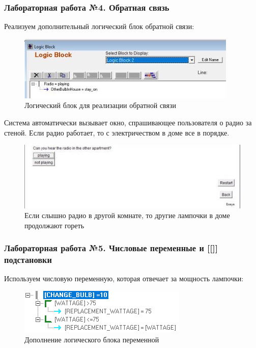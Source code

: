 \documentclass[14pt,a4paper,report]{report}
\begin{document}
\subsubsection{Лабораторная работа №4. Обратная связь}

Реализуем дополнительный логический блок обратной связи:

\begin{figure}[h!]
	\centering
	\includegraphics[scale = 1.2]{images/4_1.jpg}
	\caption{Логический блок для реализации обратной связи}
\end{figure}

Система автоматически вызывает окно, спрашивающее пользователя о радио за стеной. Если радио работает, то с электричеством в доме все в порядке.

\clearpage

\begin{figure}[h!]
	\centering
	\includegraphics[scale = 1.1]{images/4_2.jpg}
	\caption{Если слышно радио в другой комнате, то другие лампочки в доме продолжают гореть}
\end{figure}

\subsubsection{Лабораторная работа №5. Числовые переменные и [[]] подстановки}

Используем числовую переменную, которая отвечает за мощность лампочки:

\begin{figure}[h!]
	\centering
	\includegraphics[scale = 1.1]{images/5_1.png}
	\caption{Дополнение логического блока переменной}
\end{figure}
\end{document}
